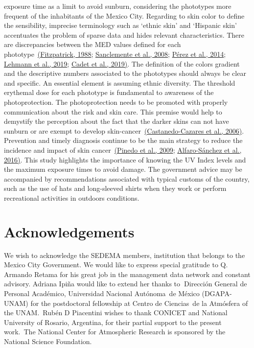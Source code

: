 \documentclass[10pt]{article}
\begin{document}
exposure time as a limit to avoid sunburn, considering the phototypes
more frequent of the inhabitants of the Mexico City. Regarding to skin
color to define the sensibility, imprecise terminology such as `ethnic
skin' and `Hispanic skin' accentuates the problem of sparse data and
hides relevant characteristics. There are discrepancies between the MED
values defined for each phototype~\hyperref[csl:30]{(Fitzpatrick, 1988}; \hyperref[csl:70]{Sanclemente et al., 2008}; \hyperref[csl:31]{Pérez et al., 2014}; \hyperref[csl:32]{Lehmann et al., 2019}; \hyperref[csl:62]{Cadet et al., 2019)}. The definition of
the colors gradient and the descriptive numbers associated to the
phototypes should always be clear and specific. An essential element is
assuming ethnic diversity. The threshold erythemal dose for each
phototype is fundamental to awareness of the photoprotection. The
photoprotection needs to be promoted with properly communication about
the risk and skin care. This premise would help to demystify the
perception about the fact that the darker skins can not have sunburn or
are exempt to develop skin-cancer~\hyperref[csl:40]{(Castanedo-Cazares et al., 2006)}. Prevention and
timely diagnosis continue to be the main strategy to reduce the
incidence and impact of skin cancer~\hyperref[csl:71]{(Pinedo et al., 2009}; \hyperref[csl:72]{Alfaro-Sánchez et al., 2016)}. This study
highlights the importance of knowing the UV Index levels and the maximum
exposure times to avoid damage. The government advice may be accompanied
by recommendations associated with typical customs of the country, such
as the use of hats and long-sleeved shirts when they work or perform
recreational activities in outdoors conditions.~

\section*{Acknowledgements}

{\label{667124}}

We wish to acknowledge the SEDEMA members, institution that belongs to
the Mexico City Government. We would like to express special gratitude
to Q. Armando Retama for his great job in the management data network
and constant advisory. Adriana Ipiña would like to extend her thanks
to\textbf{~}Dirección General de Personal Académico, Universidad
Nacional Autónoma~de México (DGAPA-UNAM) for the postdoctoral fellowship
at Centro de Ciencias~de la Atmósfera of the UNAM.~Rubén D Piacentini
wishes to thank CONICET and National University of Rosario, Argentina,
for their partial support to the present work.~The National Center for
Atmospheric Research is sponsored by the National Science Foundation.
\end{document}
